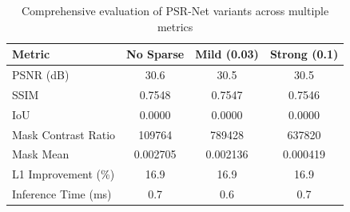 \begin{table}[h]
\centering
\caption{Comprehensive evaluation of PSR-Net variants across multiple metrics}
\begin{tabular}{lccc}
\hline
\textbf{Metric} & \textbf{No Sparse} & \textbf{Mild (0.03)} & \textbf{Strong (0.1)} \\
\hline
PSNR (dB) & 30.6 & 30.5 & 30.5 \\
SSIM & 0.7548 & 0.7547 & 0.7546 \\
IoU & 0.0000 & 0.0000 & 0.0000 \\
Mask Contrast Ratio & 109764 & 789428 & 637820 \\
Mask Mean & 0.002705 & 0.002136 & 0.000419 \\
L1 Improvement (\%) & 16.9 & 16.9 & 16.9 \\
Inference Time (ms) & 0.7 & 0.6 & 0.7 \\
\hline
\end{tabular}
\end{table}